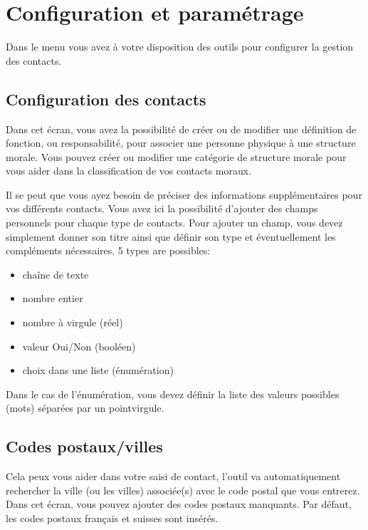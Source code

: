 \documentclass[letterpaper,10pt,french]{sphinxmanual}
\begin{document}
\noindent{}


\section{Configuration et paramétrage}
\label{\detokenize{contacts/configuration:configuration-et-parametrage}}\label{\detokenize{contacts/configuration::doc}}
Dans le menu  vous avez à votre disposition des outils pour configurer la gestion des contacts.


\subsection{Configuration des contacts}
\label{\detokenize{contacts/configuration:configuration-des-contacts}}
Dans cet écran, vous avez la possibilité de créer ou de modifier une définition de fonction, ou responsabilité, pour associer une personne physique à une structure morale. Vous pouvez créer ou modifier une catégorie de structure morale pour vous aider dans la classification de vos contacts moraux.

Il se peut que vous ayez besoin de préciser des informations supplémentaires pour vos différents contacts. Vous avez ici la possibilité d’ajouter des champs personnels pour chaque type de contacts. Pour ajouter un champ, vous devez simplement donner son titre ainsi que définir son type et éventuellement les compléments nécessaires.
5 types are possibles:
\begin{itemize}
\item {} 
chaîne de texte

\item {} 
nombre entier

\item {} 
nombre à virgule (réel)

\item {} 
valeur Oui/Non (booléen)

\item {} 
choix dans une liste (énumération)

\end{itemize}

Dans le cas de l’énumération, vous devez définir la liste des valeurs possibles (mots) séparées par un point\sphinxhyphen{}virgule.


\subsection{Codes postaux/villes}
\label{\detokenize{contacts/configuration:codes-postaux-villes}}
Cela peux vous aider dans votre saisi de contact, l’outil va automatiquement rechercher la ville (ou les villes) associée(s) avec le code postal que vous entrerez.
Dans cet écran, vous pouvez ajouter des codes postaux manquants.
Par défaut, les codes postaux français et suisses sont insérés.
\end{document}
